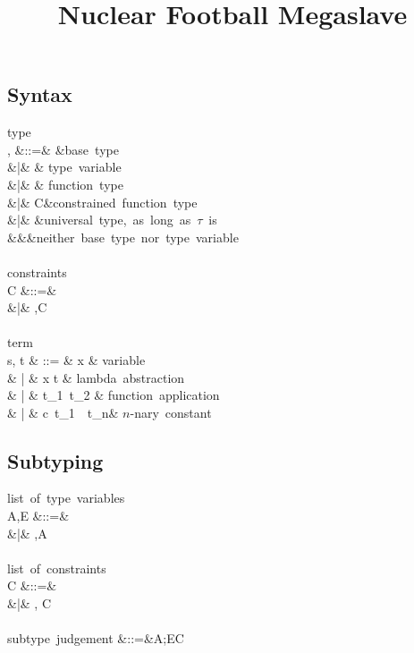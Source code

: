 \documentclass{amsart}
\title{Nuclear Football Megaslave}
\theoremstyle{definition}
\begin{document}
\maketitle
\tableofcontents

\subsection{Syntax}
\label{syntax}
\begin{syntax}
\mbox{type}\\
\sigma, \tau
&::=& \iota &\mbox{base type}\\
&|& \alpha & \mbox{type variable} \\
&|& \tau \rightarrow \tau & \mbox{function type} \\
&|& \tau\R\tau\Given C&\mbox{constrained function type}\\
&|& \All\alpha\tau&\mbox{universal type, as long as $\tau$ is}\\
&&&\quad\mbox{neither base type nor type variable}
\\
\\
\mbox{constraints}\\
C
&::=&\emptyset\\
&|& \tau\Sub\tau,C
\\
\\
\mbox{term}\\
s, t & ::= & x & \mbox{variable} \\
& | & \Abs x t  & \mbox{lambda abstraction} \\
& | & t_1~t_2 & \mbox{function application} \\
& | & c~t_1~\cdots~t_n& \mbox{$n$-nary constant}
\end{syntax}

\subsection{Subtyping}

\begin{syntax}
\mbox{list of type variables}\\
A,E
&::=& \emptyset \\
&|& \alpha,A
\\
\\
\mbox{list of constraints}\\
C
&::=& \emptyset \\
&|& \sigma \Sub \tau, C
\\
\\
\mbox{subtype judgement}
&::=&A;E\vdash C
\end{syntax}
\end{document}
